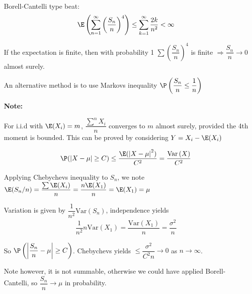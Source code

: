 \begin{prf}{}
\begin{equation*}
\begin{gathered}
    \end{gathered}
  \end{equation*}
  \par\bigskip
  \noindent Borell-Cantelli type beat:
  \begin{equation*}
    \begin{gathered}
      \E\left(\sum_{n=1}^{\infty}\left(\dfrac{S_n}{n}\right)^4\right)\leq\sum_{k=1}^{\infty}\dfrac{2k}{n^2}<\infty
    \end{gathered}
  \end{equation*}
  \par\bigskip
  \noindent If the expectation is finite, then with probability 1 $\sum\left(\dfrac{S_n}{n}\right)^4$ is finite $\Rightarrow \dfrac{S_n}{n}\to0$ almost surely.\par
  \noindent An alternative method is to use Markovs inequality $\P\left(\dfrac{S_n}{n}\leq \dfrac{1}{n}\right)$
\end{prf}
\par\bigskip
\noindent\textbf{Note:}\par
\noindent For i.i.d with $\E(X_i) = m$, $\dfrac{\sum^n X_i}{n}$ converges to $m$ almost surely, provided the 4th moment is bounded. This can be proved by considering $Y = X_i-\E(X_i)$
\par\bigskip
\begin{defo}{}
  \begin{equation*}
    \begin{gathered}
      \P(\left|X-\mu\right|\geq C)\leq \dfrac{\E(\left|X-\mu\right|^2)}{C^2} = \dfrac{\text{Var}\left(X\right)}{C^2}
    \end{gathered}
  \end{equation*}
  \par\bigskip
\end{defo}
\noindent Applying Chebychevs inequality to $S_n$, we note $\E(S_n/n) = \dfrac{\sum\E(X_i)}{n} = \dfrac{n\E(X_1)}{n} = \E(X_1) = \mu$\par
\noindent Variation is given by $\dfrac{1}{n^2}\text{Var}\left(S_n\right)$, independence yields
\begin{equation*}
  \begin{gathered}
    \dfrac{1}{n^2}n\text{Var}\left(X_1\right) = \dfrac{\text{Var}\left(X_1\right)}{n} = \dfrac{\sigma^2}{n}
  \end{gathered}
\end{equation*}\par
\noindent So $\P\left(\left|\dfrac{S_n}{n}-\mu\right|\geq C\right)$. Chebychevs yields $\leq \dfrac{\sigma^2}{C^2n}\to0$ as $n\to\infty$. \par
\noindent Note however, it is not summable, otherwise we could have applied Borell-Cantelli, so $\dfrac{S_n}{n}\to\mu$ in probability.
\par\bigskip
